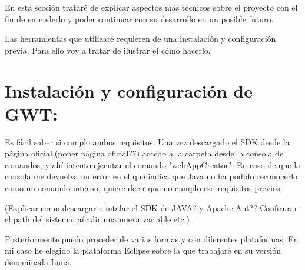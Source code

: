 
En esta sección trataré de explicar aspectos más técnicos sobre el proyecto con el fin de entenderlo y poder continuar con su desarrollo en un posible futuro.

Las herramientas que utilizaré requieren de una instalación y configuración 
previa. Para ello voy a  tratar de ilustrar el cómo hacerlo.

\section{Instalación y configuración de GWT:}


Es fácil saber si cumplo ambos requisitos. Una vez descargado el SDK desde la página oficial,(poner página oficial??) accedo a la carpeta desde la consola de comandos, y ahí intento ejecutar el comando "webAppCreator". En caso de que la consola me devuelva un error en el que indica que Java no ha podido reconocerlo como un comando interno, quiere decir que no cumplo eso requisitos previos.

(Explicar como descargar e intalar el SDK de JAVA? y Apache Ant?? Confirurar el path del sistema, añadir una nueva variable etc.)

Posteriormente puedo proceder de varias formas y con diferentes plataformas. En mi caso he elegido la plataforma Eclipse sobre la que trabajaré en  su versión denominada Luna. 

